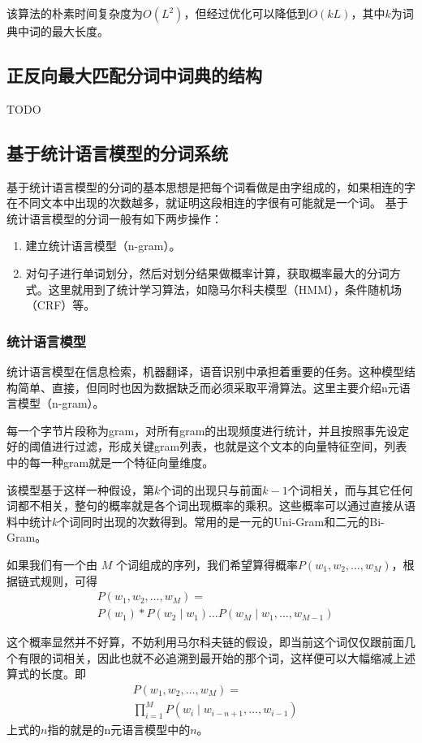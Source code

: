 \documentclass[11pt,a4paper]{article}
\begin{document}
该算法的朴素时间复杂度为$O(L^2)$，但经过优化可以降低到$O(kL)$，其中$k$为词典中词的最大长度。

\subsection{正反向最大匹配分词中词典的结构}
TODO

\subsection{基于统计语言模型的分词系统}
基于统计语言模型的分词的基本思想是把每个词看做是由字组成的，如果相连的字在不同文本中出现的次数越多，就证明这段相连的字很有可能就是一个词。
基于统计语言模型的分词一般有如下两步操作：
\begin{enumerate}
	\item 建立统计语言模型（n-gram）。
	\item 对句子进行单词划分，然后对划分结果做概率计算，获取概率最大的分词方式。这里就用到了统计学习算法，如隐马尔科夫模型（HMM），条件随机场（CRF）等。
\end{enumerate}

\subsubsection{统计语言模型}
统计语言模型在信息检索，机器翻译，语音识别中承担着重要的任务。这种模型结构简单、直接，但同时也因为数据缺乏而必须采取平滑算法。这里主要介绍n元语言模型（n-gram）。

每一个字节片段称为gram，对所有gram的出现频度进行统计，并且按照事先设定好的阈值进行过滤，形成关键gram列表，也就是这个文本的向量特征空间，列表中的每一种gram就是一个特征向量维度。

该模型基于这样一种假设，第$k$个词的出现只与前面$k-1$个词相关，而与其它任何词都不相关，整句的概率就是各个词出现概率的乘积。这些概率可以通过直接从语料中统计$k$个词同时出现的次数得到。常用的是一元的Uni-Gram和二元的Bi-Gram。

如果我们有一个由 $M$ 个词组成的序列，我们希望算得概率$P(w_1,w_2,\dots, w_M)$，根据链式规则，可得
\begin{equation}
	\begin{aligned}
	&P(w_{1}, w_{2}, \dots, w_{M})=\\
	&P(w_{1}) * P(w_{2} \mid w_{1}) \dots P(w_{M} \mid w_{1}, \dots, w_{M-1})
	\end{aligned}
\end{equation}

这个概率显然并不好算，不妨利用马尔科夫链的假设，即当前这个词仅仅跟前面几个有限的词相关，因此也就不必追溯到最开始的那个词，这样便可以大幅缩减上述算式的长度。即
\begin{equation}
	\begin{aligned}
		&P(w_{1}, w_{2}, \dots, w_{M})=\\
		&\prod_{i=1}^{M} P(w_{i} \mid w_{i-n+1}, \dots, w_{i-1})
	\end{aligned}
\end{equation}
上式的$n$指的就是的n元语言模型中的$n$。
\end{document}
